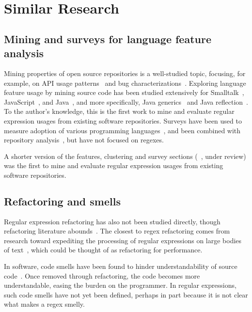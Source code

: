 \section{Similar Research}

\subsection{Mining and surveys for language feature analysis}
Mining properties of open source repositories is a well-studied topic, focusing, for example, on API usage patterns~\cite{Linares-Vasquez:2014:MEA:2597073.2597085} and bug characterizations~\cite{Chen:2014:ESD:2597073.2597108}.
Exploring language feature usage by mining source code has been studied extensively for
Smalltalk~\cite{Callau:2011:DUD:1985441.1985448, Callau:2013:DUD:2589712.2589718},
JavaScript~\cite{Richards:2010:ADB:1809028.1806598},
and Java~\cite{Dyer:2014:MBA:2568225.2568295, Grechanik:2010:EIL:1852786.1852801, Parnin:2013:AUJ:2589712.2589717, Livshits:2005:RAJ:2099708.2099724},
and more specifically,
Java generics~\cite{Parnin:2013:AUJ:2589712.2589717} and
Java reflection~\cite{Livshits:2005:RAJ:2099708.2099724}.
To the author's knowledge, this is the first work to mine and evaluate regular expression usages from existing software repositories.
Surveys have been used to measure adoption of various programming languages~\cite{Meyerovich:2013:EAP:2509136.2509515, Dattero:2004:PLG:962081.962087}, and been combined with  repository analysis~\cite{Meyerovich:2013:EAP:2509136.2509515}, but have not focused on regexes.

A shorter version of the features, clustering and survey sections (~\cite{chapman2016}, under review) was the first to mine and evaluate regular expression usages from existing software repositories.

\subsection{Refactoring and smells}
Regular expression refactoring has also not been studied directly, though refactoring literature abounds~\cite{Mens:2004:SSR:972215.972286, Opdyke:1992:ROF:169783, Griswold:1993:AAP:152388.152389}.
The closest to regex refactoring comes from research toward  expediting the processing of regular expressions on large bodies of text~\cite{Baeza-Yates:1996:FTS:235809.235810}, which could be thought of as refactoring for performance.

In software, code smells have been found to hinder understandability of source code~\cite{abbes2011empirical, du2006does}.
Once removed through refactoring, the code becomes more understandable, easing the burden on the programmer.
In regular expressions, such code smells have not yet been defined, perhaps in part because it is not clear what makes a regex smelly.

